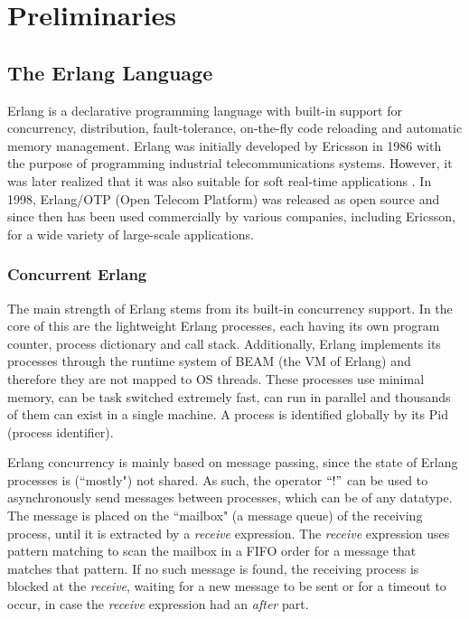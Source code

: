 \chapter{Preliminaries}
\label{sec:background}

\section{The Erlang Language}

Erlang is a declarative programming language with built-in support for concurrency,
distribution, fault-tolerance, on-the-fly code reloading and automatic memory management. 
Erlang was initially developed by Ericsson in 1986 with the purpose of programming
industrial telecommunications systems. However, it was later realized that
it was also suitable for soft real-time applications \cite{Armstrong:1996:CPE:229883}.
In 1998, Erlang/OTP (Open Telecom Platform) was released as open source and since then has been used
commercially by various companies, including Ericsson, for a wide variety of large-scale applications.

\subsection{Concurrent Erlang}

The main strength of Erlang stems from its built-in concurrency support. In the core of this 
are the lightweight Erlang processes, each having its own program counter, process dictionary and call stack.
Additionally, Erlang implements its processes through the runtime system of BEAM (the VM of Erlang)
and therefore they are not mapped to OS threads. These processes use minimal memory, can be task switched extremely fast, 
can run in parallel and thousands of them can exist in a single machine.
A process is identified globally by its Pid (process identifier).

Erlang concurrency is mainly based on message passing, since the state of Erlang processes is 
(``mostly") not shared. As such, the operator $``!"$ can be used to asynchronously send messages between processes,
which can be of any datatype. The message is placed on the ``mailbox" (a message queue) of the receiving process, 
until it is extracted by a \textit{receive} 
expression. The \textit{receive} expression uses pattern matching to scan the mailbox in a FIFO order 
for a message that matches that pattern. If no such message is found, the receiving process is blocked at the \textit{receive},
waiting for a new message to be sent or for a timeout to occur, in case the \textit{receive} expression had an \textit{after} part.

